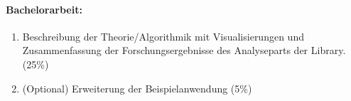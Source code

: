 \documentclass[8pt,a4paper,ngerman]{scrartcl}
\begin{document}
\paragraph{Bachelorarbeit:}
\begin{enumerate} 
    \item Beschreibung der Theorie/Algorithmik mit Visualisierungen und
        Zusammenfassung der Forschungsergebnisse des Analyseparts der
        Library. (25\%)
    \item (Optional) Erweiterung der Beispielanwendung (5\%)
\end{enumerate}

\end{document}
